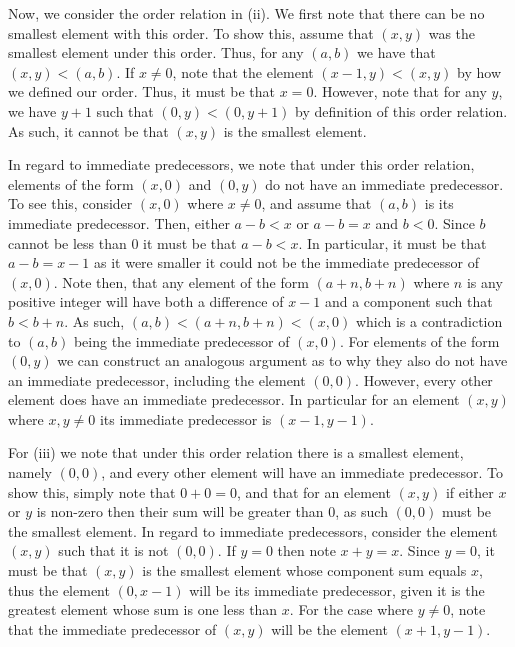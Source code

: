 \documentclass[12pt]{article}
\begin{document}
Now, we consider the order relation in (ii). We first note that there can be no smallest
element with this order. To show this, assume that $(x, y)$ was the smallest element 
under this order. Thus, for any $(a, b)$ we have that $(x, y) < (a, b)$. If $x \neq 0$,
note that the element $(x - 1, y) < (x, y)$ by how we defined our order. Thus, it must be 
that $x = 0$. However, note that for any $y$, we have $y + 1$ such that $(0, y) < (0, y+1)$ by 
definition of this order relation. As such, it cannot be that $(x, y)$ is the smallest element.

In regard to immediate predecessors, we note that under this order relation, elements of the 
form $(x, 0)$ and $(0, y)$ do not have an immediate predecessor. To see this, consider 
$(x, 0)$ where $x \neq 0$, and assume that $(a, b)$ is its immediate predecessor. Then, either
$a - b < x$ or $a - b = x$ and $b < 0$. Since $b$ cannot be less than $0$ it must 
be that $a - b < x$. In particular, it must be that $a - b = x - 1$ as it were smaller it could not
be the immediate predecessor of $(x, 0)$. Note then, that any element of the form $(a + n, b + n)$
where $n$ is any positive integer will have both a difference of $x - 1$ and a component such that 
$b < b + n$. As such, $(a, b) < (a + n, b + n) < (x, 0)$ which is a contradiction to
$(a, b)$ being the immediate predecessor of $(x, 0)$. For elements of the form $(0, y)$ we can 
construct an analogous argument as to why they also do not have an immediate predecessor, including 
the element $(0, 0)$. However, every other element does have an immediate predecessor. In particular
for an element $(x, y)$ where $x, y \neq 0$ its immediate predecessor is $(x - 1, y - 1)$.
 
For (iii) we note that under this order relation there is a smallest element, namely $(0,0)$, 
and every other element will have an immediate predecessor. 
To show this, simply note that $0 + 0 = 0$, and that for an element $(x, y)$ if either
$x$ or $y$ is non-zero then their sum will be greater than $0$, as such $(0,0)$ must be 
the smallest element. In regard to immediate predecessors, consider the element $(x, y)$ such
that it is not $(0,0)$. If $y = 0$ then  note $x + y = x$. Since $y = 0$, it must be that $(x, y)$
is the smallest element whose component sum equals $x$, thus the element $(0, x - 1)$ will be its 
immediate predecessor, given it is the greatest element whose sum is one less than $x$.
For the case where $y \neq 0$, note that the immediate predecessor of $(x, y)$ will be 
the element $(x + 1, y - 1)$. 
\end{document}
